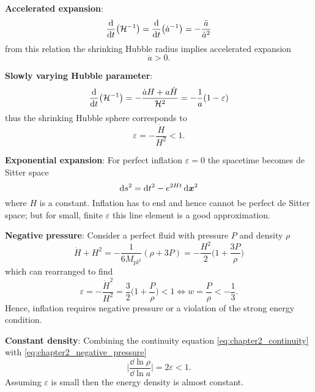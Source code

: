 \begin{hangparas}{24pt}{1}
	\textbf{Accelerated expansion}:
	\begin{equation}
		\dv{t} \big(\mathcal{H}^{-1}\big)
		= \dv{t} \big(\dot{a}^{-1}\big)
		= -\frac{\ddot{a}}{\dot{a}^{2}}
	\end{equation}
	from this relation the shrinking Hubble radius implies accelerated expansion
	\begin{equation}
		\ddot{a}
		> 0.
	\end{equation}

	\textbf{Slowly varying Hubble parameter}:
	\begin{equation}
		\dv{t} \big(\mathcal{H}^{-1}\big)
		= -\frac{\dot{a}H + a\dot{H}}{\mathcal{H}^{2}}
		= -\frac{1}{a}(1-\varepsilon)
	\end{equation}
	thus the shrinking Hubble sphere corresponds to
	\begin{equation}
		\varepsilon
		= -\frac{\dot{H}}{H^{2}}
		< 1.
	\end{equation}

	\textbf{Exponential expansion}:
	For perfect inflation \(\varepsilon=0\) the spacetime becomes de Sitter space
	\begin{equation}
		\dd{s^{2}}
		= \dd{t^{2}} - e^{2Ht} \dd{\vb*{x}^{2}}
	\end{equation}
	where \(H\) is a constant.
	Inflation has to end and hence cannot be perfect de Sitter space; but for small, finite \({\varepsilon}\) this line element is a good approximation.

	\textbf{Negative pressure}:
	Consider a perfect fluid with pressure \(P\) and density \({\rho}\)
	\begin{equation}\label{eq:chapter2_negative_pressure}
		\dot{H} + H^{2}
		= -\frac{1}{6M_{\text{pl}^{2}}}(\rho+3P)
		= -\frac{H^{2}}{2} \bigg(1 + \frac{3P}{\rho}\bigg)
	\end{equation}
	which can rearranged to find
	\begin{equation}
		\varepsilon
		= -\frac{\dot{H}^{2}}{H^{2}}
		= \frac{3}{2} \bigg(1 + \frac{P}{\rho}\bigg) < 1 \Leftrightarrow w = \frac{P}{\rho} < -\frac{1}{3}.
	\end{equation}
	Hence, inflation requires negative pressure or a violation of the strong energy condition.

	\textbf{Constant density}:
	Combining the continuity equation \cref{eq:chapter2_continuity} with \cref{eq:chapter2_negative_pressure}
	\begin{equation}
		\bigg\lvert\frac{\dd{\ln{\rho}}}{\dd{\ln{a}}}\bigg\rvert
		= 2\varepsilon
		< 1.
	\end{equation}
	Assuming \({\varepsilon}\) is small then the energy density is almost constant.
\end{hangparas}


